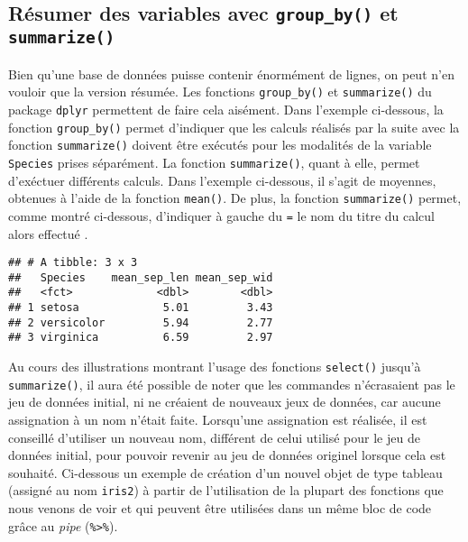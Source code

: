\documentclass[
  french,
]{book}
\newenvironment{Shaded}{\begin{snugshade}}{\end{snugshade}}
\newcommand{\DataTypeTok}[1]{\textcolor[rgb]{0.13,0.29,0.53}{#1}}
\newcommand{\KeywordTok}[1]{\textcolor[rgb]{0.13,0.29,0.53}{\textbf{#1}}}
\newcommand{\NormalTok}[1]{#1}
\newcommand{\OperatorTok}[1]{\textcolor[rgb]{0.81,0.36,0.00}{\textbf{#1}}}
\newcommand{\StringTok}[1]{\textcolor[rgb]{0.31,0.60,0.02}{#1}}
\begin{document}
\hypertarget{ruxe9sumer-des-variables-avec-group_by-et-summarize}{%
\subsection{\texorpdfstring{Résumer des variables avec \texttt{group\_by()} et \texttt{summarize()}}{Résumer des variables avec group\_by() et summarize()}}\label{ruxe9sumer-des-variables-avec-group_by-et-summarize}}

Bien qu'une base de données puisse contenir énormément de lignes, on peut n'en vouloir que la version résumée. Les fonctions \texttt{group\_by()} et \texttt{summarize()} du package \texttt{dplyr} permettent de faire cela aisément. Dans l'exemple ci-dessous, la fonction \texttt{group\_by()} permet d'indiquer que les calculs réalisés par la suite avec la fonction \texttt{summarize()} doivent être exécutés pour les modalités de la variable \texttt{Species} prises séparément. La fonction \texttt{summarize()}, quant à elle, permet d'exéctuer différents calculs. Dans l'exemple ci-dessous, il s'agit de moyennes, obtenues à l'aide de la fonction \texttt{mean()}. De plus, la fonction \texttt{summarize()} permet, comme montré ci-dessous, d'indiquer à gauche du \texttt{=} le nom du titre du calcul alors effectué .

\begin{Shaded}
\end{Shaded}

\begin{verbatim}
## # A tibble: 3 x 3
##   Species    mean_sep_len mean_sep_wid
##   <fct>             <dbl>        <dbl>
## 1 setosa             5.01         3.43
## 2 versicolor         5.94         2.77
## 3 virginica          6.59         2.97
\end{verbatim}

Au cours des illustrations montrant l'usage des fonctions \texttt{select()} jusqu'à \texttt{summarize()}, il aura été possible de noter que les commandes n'écrasaient pas le jeu de données initial, ni ne créaient de nouveaux jeux de données, car aucune assignation à un nom n'était faite. Lorsqu'une assignation est réalisée, il est conseillé d'utiliser un nouveau nom, différent de celui utilisé pour le jeu de données initial, pour pouvoir revenir au jeu de données originel lorsque cela est souhaité. Ci-dessous un exemple de création d'un nouvel objet de type tableau (assigné au nom \texttt{iris2}) à partir de l'utilisation de la plupart des fonctions que nous venons de voir et qui peuvent être utilisées dans un même bloc de code grâce au \emph{pipe} (\texttt{\%\textgreater{}\%}).
\end{document}
